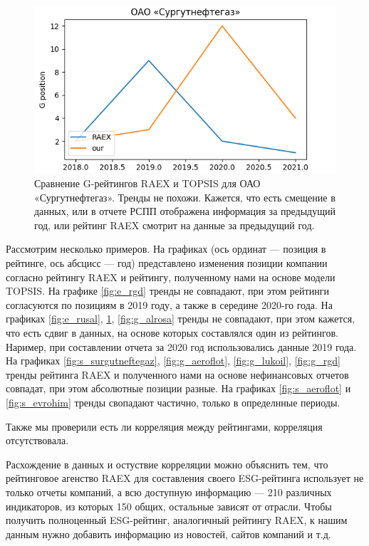 \documentclass[a4paper, 14pt]{extarticle}
\begin{document}
\begin{figure}[H]
\centering
\includegraphics[width=0.8\linewidth]{images/G_ОАО «Сургутнефтегаз».png}
\caption{Сравнение G-рейтингов RAEX и TOPSIS для ОАО «Сургутнефтегаз». Тренды не похожи. Кажется, что есть смещение в данных, или в отчете РСПП отображена информация за предыдущий год, или рейтинг RAEX смотрит на данные за предыдущий год.}
\label{fig:g_surgutneftegaz}
\end{figure}


Рассмотрим несколько примеров. На графиках (ось ординат --- позиция в рейтинге, ось абсцисс --- год) представлено изменения позиции компании согласно рейтингу RAEX и рейтингу, полученному нами на основе модели TOPSIS. На графике \ref{fig:e_rgd} тренды не совпадают, при этом рейтинги согласуются по позициям в 2019 году, а также в середине 2020-го года. На графиках \ref{fig:e_rusal}, \ref{fig:g_surgutneftegaz}, \ref{fig:g_alrosa} тренды не совпадают, при этом кажется, что есть сдвиг в данных, на основе которых составлялся один из рейтингов. Наример, при составлении отчета за 2020 год использовались данные 2019 года. На графиках \ref{fig:s_surgutneftegaz}, \ref{fig:g_aeroflot}, \ref{fig:g_lukoil}, \ref{fig:g_rgd} тренды рейтинга RAEX и полученного нами на основе нефинансовых отчетов совпадат, при этом абсолютные позиции разные. На графиках \ref{fig:s_aeroflot} и \ref{fig:s_evrohim} тренды свопадают частично, только в определнные периоды.

Также мы проверили есть ли корреляция между рейтингами, корреляция отсутствовала.

Расхождение в данных и остуствие корреляции можно объяснить тем, что рейтинговое агенство RAEX для составления своего ESG-рейтинга использует не только отчеты компаний, а всю доступную информацию --- 210 различных индикаторов, из которых 150 общих, остальные зависят от отрасли. Чтобы получить полноценный ESG-рейтинг, аналогичный рейтингу RAEX, к нашим данным нужно добавить информацию из новостей, сайтов компаний и т.д.
\end{document}
